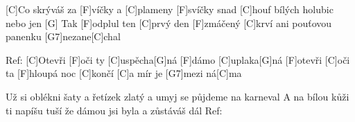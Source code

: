 
[C]Co skrýváš za [F]víčky a [C]plameny [F]svíčky
snad [C]houf bílých holubic nebo jen [G]
Tak [F]odplul ten [C]prvý den [F]zmáčený [C]krví
ani pouťovou panenku [G7]nezane[C]chal

Ref:
[C]Otevři [F]oči ty [C]uspěcha[G]ná
[F]dámo [C]uplaka[G]ná
[F]otevři [C]oči ta [F]hloupá noc [C]končí
[C]a mír je [G7]mezi ná[C]ma

Už si oblékni šaty a řetízek zlatý
a umyj se půjdeme na karneval
A na bílou kůži ti napíšu tuší
že dámou jsi byla a zůstáváš dál
Ref: